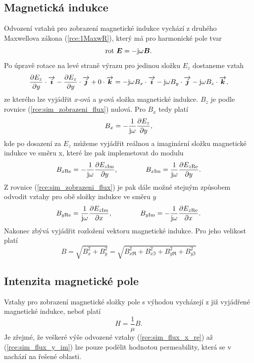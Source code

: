 \subsection*{Magnetická indukce}
Odvození vztahů pro zobrazení magnetické indukce vychází z druhého Maxwellova zákona (\ref{rce:1MaxwR}), který má pro harmonické pole tvar
\begin{displaymath}
	\mathrm{rot}\ \mbox{\boldmath$E$} = -\mathrm{j}\omega\mbox{\boldmath$B$}.
\end{displaymath}
Po úpravě rotace na levé straně výrazu pro jedinou složku $E_z$ dostaneme vztah
\begin{equation}
	\frac{\partial E_z}{\partial y}\cdot\overrightarrow{\mbox{\boldmath$i$}} - \frac{\partial E_z}{\partial y}\cdot\overrightarrow{\mbox{\boldmath$j$}} + 0\cdot\overrightarrow{\mbox{\boldmath$k$}} = -\mathrm{j}\omega B_x\cdot\overrightarrow{\mbox{\boldmath$i$}} - \mathrm{j}\omega B_y\cdot\overrightarrow{\mbox{\boldmath$j$}} - \mathrm{j}\omega B_z\cdot\overrightarrow{\mbox{\boldmath$k$}},
	\label{rce:sim_zobrazeni_flux}
\end{equation}
ze kterého lze vyjádřit $x$-ová a $y$-ová složka magnetické indukce. $B_z$ je podle rovnice (\ref{rce:sim_zobrazeni_flux}) nulová. Pro $B_x$ tedy platí
\begin{displaymath}
	B_x = -\frac{1}{\mathrm{j}\omega}\frac{\partial E_z}{\partial y},
\end{displaymath}
kde po dosazení za $E_z$ můžeme vyjádřit reálnou a imaginární složku magnetické indukce ve směru x, které lze pak implemetovat do modulu
\begin{equation}
	B_{x\mathrm{Re}} = -\frac{1}{\mathrm{j}\omega}\frac{\partial E_{z\mathrm{Im}}}{\partial y}, \qquad \qquad B_{x\mathrm{Im}} = \frac{1}{\mathrm{j}\omega}\frac{\partial E_{z\mathrm{Re}}}{\partial y}.
	\label{rce:sim_flux_x_re}
\end{equation}
Z rovnice (\ref{rce:sim_zobrazeni_flux}) je pak dále možné stejným způsobem odvodit vztahy pro obě složky indukce ve směru $y$
\begin{equation}
	B_{y\mathrm{Re}} = \frac{1}{\mathrm{j}\omega}\frac{\partial E_{z\mathrm{Im}}}{\partial x}, \qquad \qquad B_{y\mathrm{Im}} = -\frac{1}{\mathrm{j}\omega}\frac{\partial E_{z\mathrm{Re}}}{\partial x}.
	\label{rce:sim_flux_y_im}
\end{equation}
Nakonec zbývá vyjádřit rozložení vektoru magnetické indukce. Pro jeho velikost platí
\begin{displaymath}
	B = \sqrt{B_{x}^{2} + B_{y}^{2}} = \sqrt{B_{x\Re}^{2} + B_{x\Im}^{2} + B_{y\Re}^{2} + B_{y\Im}^{2}}
\end{displaymath}

\subsection*{Intenzita magnetické pole}
Vztahy pro zobrazení magnetické složky pole s výhodou vycházejí z již vyjádřené magnetické indukce, neboť platí
\begin{displaymath}
H = \frac{1}{\mu} B.
\end{displaymath}
Je zřejmé, že veškeré výše odvozené vztahy (\ref{rce:sim_flux_x_re}) až (\ref{rce:sim_flux_y_im}) lze pouze podělit hodnotou permeability, která se v nachází na řešené oblasti. 

